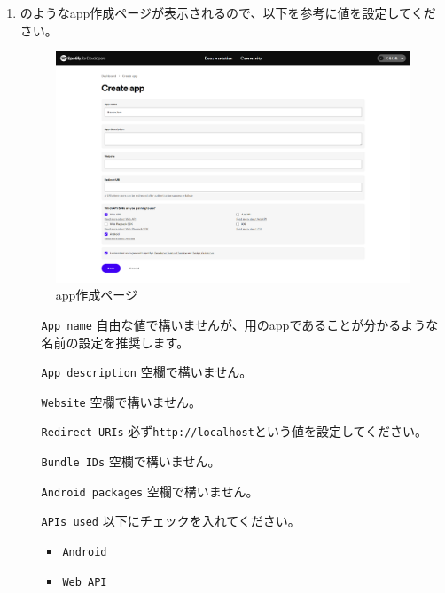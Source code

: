 \begin{enumerate}
                \newpage
                \item {}のようなapp作成ページが表示されるので、以下を参考に値を設定してください。
                \label{item:spotify7}
                    \begin{figure}[htbp]
                        \centering
                        \includegraphics[width=\linewidth]{./pictures/Spotify6.png}
                        \caption{app作成ページ}
                        \label{img:spotify6}
                    \end{figure}
                    \begin{itemize}
                        \item[\texttt{App name}] 自由な値で構いませんが、\bj 用のappであることが分かるような名前の設定を推奨します。
                        \item[\texttt{App description}] 空欄で構いません。
                        \item[\texttt{Website}] 空欄で構いません。
                        \item[\texttt{Redirect URIs}] 必ず\texttt{http://localhost}という値を設定してください。
                        \item[\texttt{Bundle IDs}] 空欄で構いません。
                        \item[\texttt{Android packages}] 空欄で構いません。
                        \item[\texttt{APIs used}] 以下にチェックを入れてください。
                            \begin{itemize}
                                \item \texttt{Android}
                                \item \texttt{Web API}
                            \end{itemize}
                    \end{itemize}


\end{enumerate}
